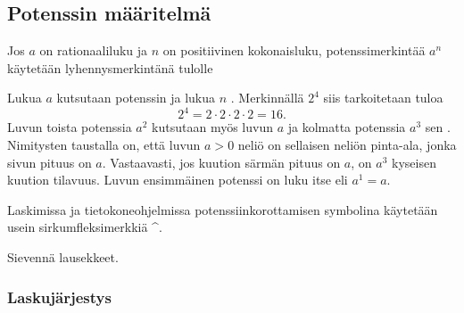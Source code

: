 \subsection{Potenssin määritelmä}

Jos $a$ on rationaaliluku ja $n$ on positiivinen kokonaisluku, potenssimerkintää $a^n$ käytetään lyhennysmerkintänä tulolle
   
\laatikko[Potenssi]{    \[
        a^n = \underbrace{a\cdot \ldots \cdot a}_{n\text{ kpl}}. 
    \]}
    
Lukua $a$ kutsutaan potenssin  ja lukua $n$ . Merkinnällä $2^4$ siis tarkoitetaan tuloa 
        \[
            2^4=2\cdot 2\cdot 2\cdot 2=16.
        \]
Luvun toista potenssia $a^2$ kutsutaan myös luvun $a$  ja kolmatta potenssia $a^3$ sen . Nimitysten taustalla on, että luvun $a>0$ neliö on sellaisen neliön pinta-ala, jonka sivun pituus on $a$. Vastaavasti, jos kuution särmän pituus on $a$, on $a^3$ kyseisen kuution tilavuus. Luvun ensimmäinen potenssi on luku itse eli $a^1 = a$.

Laskimissa ja tietokoneohjelmissa potenssiinkorottamisen symbolina käytetään usein sirkumfleksimerkkiä \^{}.

\begin{esimerkki}
Sievennä lausekkeet.
	\begin{esimratk}
	
	\end{esimratk}
	
	\begin{esimvast}
	\end{esimvast}	

\end{esimerkki}


\subsubsection*{Laskujärjestys} %

